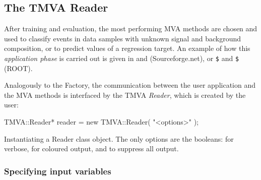 \subsection{The TMVA Reader}
\label{sec:usingtmva:reader}

After training and evaluation, the most performing MVA methods are chosen and 
used to classify events in data samples with unknown signal and background composition,
or to predict values of a regression target. An example of how this {\em application phase} 
is carried out is given in  and
 (Sourceforge.net), or 
{\tt \$} and
{\tt \$} (ROOT).

Analogously to the Factory, the communication between the user application and 
the MVA methods is interfaced by the TMVA {\em Reader}, which is created by 
the user:
\begin{codeexample}
\begin{tmvacode}
TMVA::Reader* reader = new TMVA::Reader( "<options>" );
\end{tmvacode}
\caption[.]{\codeexampleCaptionSize Instantiating a Reader class object. The only
            options are the booleans:  for verbose,  for coloured output, 
            and  to suppress all output.}
\end{codeexample}

\subsubsection{Specifying input variables}

